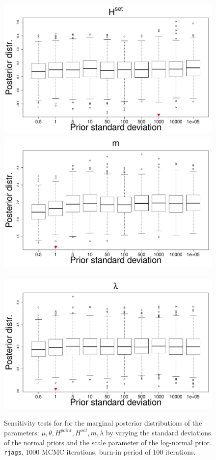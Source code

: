 \documentclass{statsoc}
\begin{document}
\begin{figure}
\includegraphics[scale=0.25]{Sensitivity/H_set_sensitivity.pdf}\\
\includegraphics[scale=0.25]{Sensitivity/m_sensitivity.pdf}~
\includegraphics[scale=0.25]{Sensitivity/lambda_sensitivity.pdf}\\
\caption{Sensitivity tests for for the marginal posterior distributions of the parameters: $\mu, \theta, H^{point}, H^{set}, m, \lambda$ by varying the standard deviations of the normal priors and the scale parameter of the log-normal prior. {\tt rjags}, 1000 MCMC iterations, burn-in period of 100 iterations.}
\label{figS1}
\end{figure}
%
\end{document}
